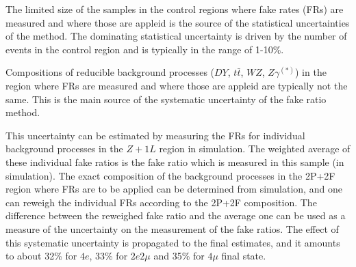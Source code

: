 The limited size of the samples in the control regions where fake rates (FRs) are measured and where those are appleid is the source of the statistical uncertainties of the method. The dominating statistical uncertainty is driven by the number of events in the control region and is typically in the range of 1-10\%. 

Compositions of reducible background processes ($DY$, $t \bar{t}$, $WZ$, $Z\gamma^{(*)}$) in the region where FRs are measured and where those are appleid are typically not the same. This is the main source of the systematic uncertainty of the fake ratio method.

This uncertainty can be estimated by measuring the FRs for individual background processes in the $Z+1L$ region in simulation. The weighted average of these individual fake ratios is the fake ratio which is measured in this sample (in simulation). The exact composition of the background processes in the 2P+2F region where FRs are to be applied  can be determined from simulation, and one can reweigh the individual FRs according to the 2P+2F composition. The difference between the reweighed fake ratio and the average one can be used as a measure of the uncertainty on the measurement of the fake ratios.
 The effect of this systematic uncertainty is propagated to the final estimates, and it amounts to about 32\% for $4e$, 33\% for $2e2\mu$ and 35\% for $4\mu$ final state.



